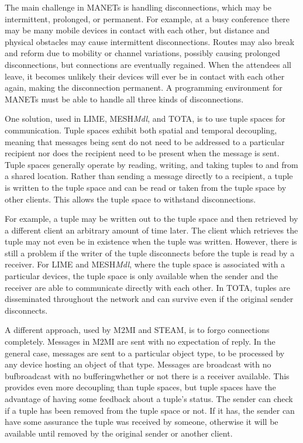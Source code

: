 \documentclass{sig-alternate}
\begin{document}
The main challenge in MANETs is handling disconnections, which may be intermittent, prolonged, or permanent. For example, at a busy conference there may be many mobile devices in contact with each other, but distance and physical obstacles may cause intermittent disconnections. Routes may also break and reform due to mobility or channel variations, possibly causing prolonged disconnections, but connections are eventually regained. When the attendees all leave, it becomes unlikely their devices will ever be in contact with each other again, making the disconnection permanent. A programming environment for MANETs must be able to handle all three kinds of disconnections.

One solution, used in LIME, MESH\textit{Mdl}, and TOTA, is to use tuple spaces for communication. Tuple spaces exhibit both spatial and temporal decoupling, meaning that messages being sent do not need to be addressed to a particular recipient nor does the recipient need to be present when the message is sent. Tuple spaces generally operate by reading, writing, and taking tuples to and from a shared location. Rather than sending a message directly to a recipient, a tuple is written to the tuple space and can be read or taken from the tuple space by other clients. This allows the tuple space to withstand disconnections.

For example, a tuple may be written out to the tuple space and then retrieved by a different client an arbitrary amount of time later. The client which retrieves the tuple may not even be in existence when the tuple was written. However, there is still a problem if the writer of the tuple disconnects before the tuple is read by a receiver. For LIME and MESH\textit{Mdl}, where the tuple space is associated with a particular devices, the tuple space is only available when the sender and the receiver are able to communicate directly with each other. In TOTA, tuples are disseminated throughout the network and can survive even if the original sender disconnects.

A different approach, used by M2MI and STEAM, is to forgo connections completely. Messages in M2MI are sent with no expectation of reply. In the general case, messages are sent to a particular object type, to be processed by any device hosting an object of that type. Messages are broadcast with no bufbroadcast with no bufferingwhether or not there is a receiver available. This provides even more decoupling than tuple spaces, but tuple spaces have the advantage of having some feedback about a tuple's status. The sender can check if a tuple has been removed from the tuple space or not. If it has, the sender can have some assurance the tuple was received by someone, otherwise it will be available until removed by the original sender or another client.
\end{document}
